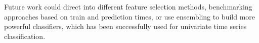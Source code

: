 \documentclass[sigconf]{acmart}
\begin{document}
Future work could direct into different feature selection methods, benchmarking approaches based on train and prediction times, or use ensembling to build more powerful classifiers, which has been successfully used for univariate time series classification.



\end{document}
